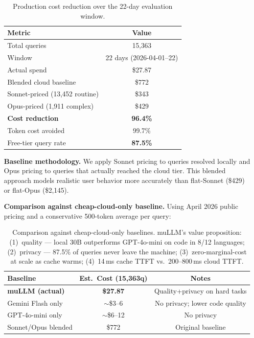 \documentclass[11pt]{article}
\begin{document}
\begin{table}[t]
\centering
\small
\begin{tabular}{lc}
\toprule
\textbf{Metric} & \textbf{Value} \\
\midrule
Total queries & 15,363 \\
Window & 22 days (2026-04-01--22) \\
Actual spend & \$27.87 \\
Blended cloud baseline & \$772 \\
\quad Sonnet-priced (13,452 routine) & \$343 \\
\quad Opus-priced (1,911 complex) & \$429 \\
\textbf{Cost reduction} & \textbf{96.4\%} \\
Token cost avoided & 99.7\% \\
Free-tier query rate & \textbf{87.5\%} \\
\bottomrule
\end{tabular}
\caption{Production cost reduction over the 22-day evaluation window.}
\label{tab:cost}
\end{table}

\textbf{Baseline methodology.} We apply Sonnet pricing to queries
resolved locally and Opus pricing to queries that actually reached the
cloud tier. This blended approach models realistic user behavior more
accurately than flat-Sonnet (\$429) or flat-Opus (\$2,145).

\textbf{Comparison against cheap-cloud-only baseline.} Using April 2026
public pricing and a conservative 500-token average per query:

\begin{table}[t]
\centering
\small
\begin{tabular}{lcc}
\toprule
\textbf{Baseline} & \textbf{Est.\ Cost (15,363q)} & \textbf{Notes} \\
\midrule
\textbf{muLLM (actual)} & \textbf{\$27.87} & Quality+privacy on hard tasks \\
Gemini Flash only & $\sim$\$3--6 & No privacy; lower code quality \\
GPT-4o-mini only & $\sim$\$6--12 & No privacy \\
Sonnet/Opus blended & \$772 & Original baseline \\
\bottomrule
\end{tabular}
\caption{Comparison against cheap-cloud-only baselines. muLLM's value
proposition: (1)~quality --- local 30B outperforms GPT-4o-mini on code
in 8/12 languages; (2)~privacy --- 87.5\% of queries never leave the
machine; (3)~zero-marginal-cost at scale as cache warms;
(4)~14\,ms cache TTFT vs.\ 200--800\,ms cloud TTFT.}
\label{tab:cheapcloud}
\end{table}
\end{document}
